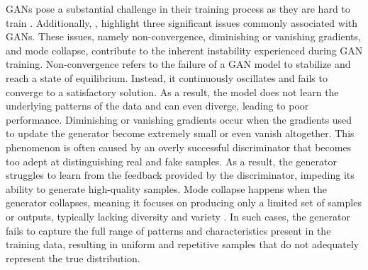 GANs pose a substantial challenge in their training process as they are hard to train \citep{goodfellowGAN}. Additionally, \citeauthor{brophyGAN}, highlight three significant issues commonly associated with GANs. These issues, namely non-convergence, diminishing or vanishing gradients, and mode collapse, contribute to the inherent instability experienced during GAN training. Non-convergence refers to the failure of a GAN model to stabilize and reach a state of equilibrium. Instead, it continuously oscillates and fails to converge to a satisfactory solution. As a result, the model does not learn the underlying patterns of the data and can even diverge, leading to poor performance. Diminishing or vanishing gradients occur when the gradients used to update the generator become extremely small or even vanish altogether. This phenomenon is often caused by an overly successful discriminator that becomes too adept at distinguishing real and fake samples. As a result, the generator struggles to learn from the feedback provided by the discriminator, impeding its ability to generate high-quality samples. Mode collapse happens when the generator collapses, meaning it focuses on producing only a limited set of samples or outputs, typically lacking diversity and variety \citep{salimansNIPS}. In such cases, the generator fails to capture the full range of patterns and characteristics present in the training data, resulting in uniform and repetitive samples that do not adequately represent the true distribution.
